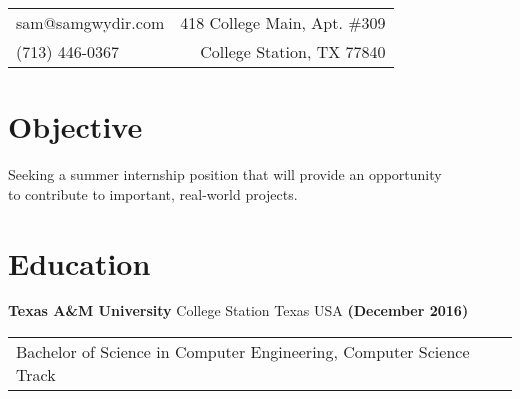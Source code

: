 \documentclass[margin,line,12pt]{res}
\newenvironment{list1}{
\begin{list}{\ding{113}}{%
  \setlength{\itemsep}{0in}
  \setlength{\parsep}{0in} \setlength{\parskip}{0in}
  \setlength{\topsep}{0in} \setlength{\partopsep}{0in}
  \setlength{\leftmargin}{0.17in}}}{\end{list}}
\newenvironment{list2}{
\begin{list}{$\bullet$}{%
  \setlength{\itemsep}{0in}
  \setlength{\parsep}{0in} \setlength{\parskip}{0in}
  \setlength{\topsep}{0in} \setlength{\partopsep}{0in}
  \setlength{\leftmargin}{0.2in}}}{\end{list}}
\begin{document}
\hfill
\vspace*{-.45in}
\begin{tabular}{l r}
sam@samgwydir.com & 418 College Main, Apt. \#309\\
(713) 446-0367 & College Station, TX 77840
\end{tabular}

\vspace*{.1in}
{\color{Black}
\begin{resume}

{\color{Black}
  \section{\sc Objective}}
Seeking a summer internship position that will provide an opportunity \\
to contribute to important, real-world projects.

\color{black}
{\color{Black}
  \vspace{-.1in}
  \section{\sc Education}}

{\bf Texas A\&M University} College Station Texas USA \hfill {\bf (December 2016)} \ \\
\vspace*{-.17in}
\begin{tabular}{l l l}
  Bachelor of Science in Computer Engineering, Computer Science Track \\
\end{tabular}



\end{resume}}
\end{document}
